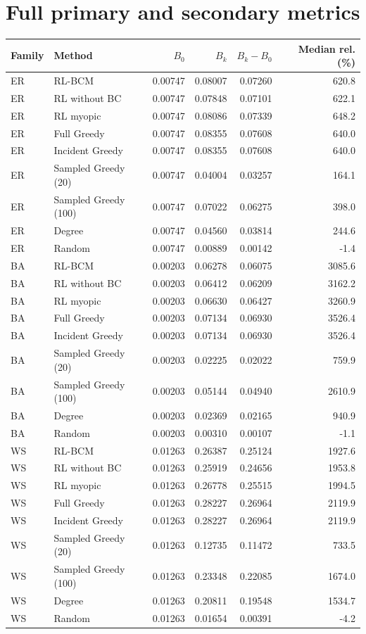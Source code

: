 \documentclass[11pt]{article}
\begin{document}
\section{Full primary and secondary metrics}
\begin{longtable}{llrrrr}
\toprule Family & Method & $B_0$ & $B_k$ & $B_k-B_0$ & Median rel. (\%)\\ \midrule\endhead
ER & RL-BCM & 0.00747 & 0.08007 & 0.07260 & 620.8\\
ER & RL without BC & 0.00747 & 0.07848 & 0.07101 & 622.1\\
ER & RL myopic & 0.00747 & 0.08086 & 0.07339 & 648.2\\
ER & Full Greedy & 0.00747 & 0.08355 & 0.07608 & 640.0\\
ER & Incident Greedy & 0.00747 & 0.08355 & 0.07608 & 640.0\\
ER & Sampled Greedy (20) & 0.00747 & 0.04004 & 0.03257 & 164.1\\
ER & Sampled Greedy (100) & 0.00747 & 0.07022 & 0.06275 & 398.0\\
ER & Degree & 0.00747 & 0.04560 & 0.03814 & 244.6\\
ER & Random & 0.00747 & 0.00889 & 0.00142 & -1.4\\
BA & RL-BCM & 0.00203 & 0.06278 & 0.06075 & 3085.6\\
BA & RL without BC & 0.00203 & 0.06412 & 0.06209 & 3162.2\\
BA & RL myopic & 0.00203 & 0.06630 & 0.06427 & 3260.9\\
BA & Full Greedy & 0.00203 & 0.07134 & 0.06930 & 3526.4\\
BA & Incident Greedy & 0.00203 & 0.07134 & 0.06930 & 3526.4\\
BA & Sampled Greedy (20) & 0.00203 & 0.02225 & 0.02022 & 759.9\\
BA & Sampled Greedy (100) & 0.00203 & 0.05144 & 0.04940 & 2610.9\\
BA & Degree & 0.00203 & 0.02369 & 0.02165 & 940.9\\
BA & Random & 0.00203 & 0.00310 & 0.00107 & -1.1\\
WS & RL-BCM & 0.01263 & 0.26387 & 0.25124 & 1927.6\\
WS & RL without BC & 0.01263 & 0.25919 & 0.24656 & 1953.8\\
WS & RL myopic & 0.01263 & 0.26778 & 0.25515 & 1994.5\\
WS & Full Greedy & 0.01263 & 0.28227 & 0.26964 & 2119.9\\
WS & Incident Greedy & 0.01263 & 0.28227 & 0.26964 & 2119.9\\
WS & Sampled Greedy (20) & 0.01263 & 0.12735 & 0.11472 & 733.5\\
WS & Sampled Greedy (100) & 0.01263 & 0.23348 & 0.22085 & 1674.0\\
WS & Degree & 0.01263 & 0.20811 & 0.19548 & 1534.7\\
WS & Random & 0.01263 & 0.01654 & 0.00391 & -4.2\\
\bottomrule\end{longtable}
\end{document}

